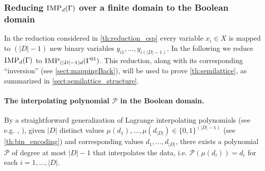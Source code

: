 \documentclass[11pt]{article}
\newcommand{\IMP}{\textsc{IMP}}
\newcommand{\1}{\textbf{1}}
\newcommand\p{\mathcal{P}}
\newcommand\uval{{(|D|-1)}}
\begin{document}
\subsubsection[Reducing IMPd(Gamma) over a finite domain to the Boolean domain]{Reducing $\IMP_{d}(\Gamma)$ over a finite domain to the Boolean domain} \label{sect:2Bool}
In the reduction considered in \cref{th:reduction_csp}  every variable $x_i\in X$ is mapped to $\uval$ new binary variables $y_{i1},\ldots, y_{i\uval}$.
In the following we reduce $\IMP_{d}(\Gamma)$ to $\IMP_{\uval d}(\Gamma^{01})$. This reduction, along with its corresponding ``inversion'' (see \cref{sect:mappingBack}), will be used to prove \cref{th:semilattice}, as summarized in \cref{sect:semilattice_structure}.

\paragraph{The interpolating polynomial $\p$ in the Boolean domain.} 
By a straightforward generalization of Lagrange interpolating polynomials (see e.g. \cite{phillips2003interpolation}, \cite{Gasca2000-hx}), given $|D|$ distinct values  $\mu(d_1),\ldots,\mu(d_{|D|})\in \{0,1\}^{\uval}$ (see \cref{th:bin_encoding}) and corresponding values $d_1,\ldots, d_{|D|}$, there exists a polynomial $\p$ of degree at most $|D|-1$ that interpolates the data, i.e. $\p(\mu(d_i))=d_i$ for each $i=1,\ldots,|D|$.
\end{document}
